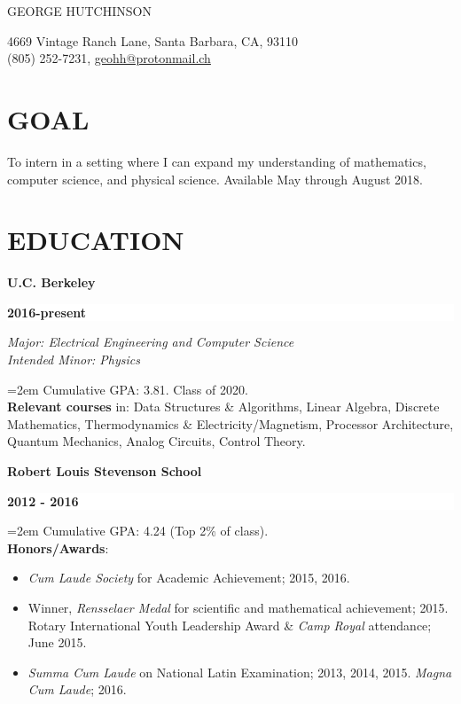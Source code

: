 \documentclass[paper=a4,fontsize=11pt]{scrartcl} %
\newlength{\spacebox}
\newcommand{\sepspace}{\vspace*{0.5em}}		%
\newcommand{\MyName}[1]{ %
		\Huge \usefont{OT1}{phv}{b}{n} \hfill #1
		\par \normalsize \normalfont}
\newcommand{\MyContact}[1]{ %
		\large \usefont{OT1}{phv}{m}{n}\hfill #1
		\par \normalsize \normalfont}
\newcommand{\NewPart}[1]{\section*{\uppercase{#1}}}
\newcommand{\PersonalEntry}[2]{
		\noindent\hangindent=2em\hangafter=0 %
		\parbox{\spacebox}{        %
		\textit{#1}}		       %
		\hspace{1.5em} #2 \par}    %
\newcommand{\EducationEntry}[4]{
		\noindent \textbf{#1} \hfill      %
		\colorbox{White}{%
			\parbox{6.5em}{%
			\hfill\color{Black}\textbf{#2}}} \par  %
		\noindent \textit{#3} \par        %
		\noindent\hangindent=2em\hangafter=0 \small #4 %
		\normalsize \par}
\newcommand{\EducationEntryNoSubtitle}[3]{
	\noindent \textbf{#1} \hfill      %
	\colorbox{White}{%
		\parbox{6em}{%
			\hfill\color{Black}\textbf{#2}}} \par %
	\noindent\hangindent=2em\hangafter=0 \small #3 %
	\normalsize \par}
\begin{document}

\MyName{GEORGE HUTCHINSON}
\MyContact{4669 Vintage Ranch Lane, Santa Barbara, CA, 93110\\\hspace*{\fill}(805) 252-7231, \url{geohh@protonmail.ch}}
\vspace*{-2em}

%

\label{GOAL}
\NewPart{Goal}

To intern in a setting where I can expand my understanding of mathematics, computer science, and physical science.
Available May through August 2018.
\vspace{-1em}

\label{EDU}
\NewPart{Education}{}

\EducationEntry{U.C. Berkeley}{2016-present}{Major: Electrical Engineering and Computer Science\\Intended Minor: Physics}{Cumulative GPA: 3.81. Class of 2020.\\\textbf{Relevant courses} in: Data Structures \& Algorithms, Linear Algebra, Discrete Mathematics, Thermodynamics \& Electricity/Magnetism, Processor Architecture, Quantum Mechanics, Analog Circuits, Control Theory.}
\sepspace

\EducationEntryNoSubtitle{Robert Louis Stevenson School}{2012 - 2016}{Cumulative GPA: 4.24 (Top 2\% of class).\\\textbf{Honors/Awards}:\begin{itemize}\setlength\itemsep{0em}
		\item\textit{Cum Laude Society} for Academic Achievement; 2015, 2016.
		\item Winner, \textit{Rensselaer Medal} for scientific and mathematical achievement; 2015.
		\indent Rotary International Youth Leadership Award \& \textit{Camp Royal} attendance; June 2015.
		\item \textit{Summa Cum Laude} on National Latin Examination; 2013, 2014, 2015. \textit{Magna Cum Laude}; 2016.\end{itemize}
}
\vspace{-1.5em}
\end{document}
